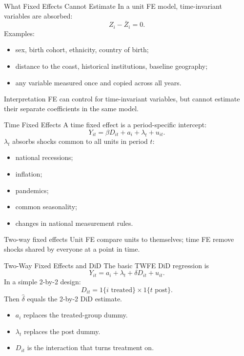 \documentclass[11pt,aspectratio=169]{beamer}
\newcommand{\derivbutton}[1]{\vspace{0.4em}\hfill\hyperlink{app:#1}{\beamerbutton{Appendix details}}}
\begin{document}
\begin{frame}{What Fixed Effects Cannot Estimate}
  In a unit FE model, time-invariant variables are absorbed:
  \[
    Z_i-\bar Z_i=0.
  \]
  Examples:
  \begin{itemize}
    \item sex, birth cohort, ethnicity, country of birth;
    \item distance to the coast, historical institutions, baseline geography;
    \item any variable measured once and copied across all years.
  \end{itemize}
  \begin{block}{Interpretation}
    FE can control for time-invariant variables, but cannot estimate their separate coefficients in the same model.
  \end{block}
\end{frame}

\begin{frame}{Time Fixed Effects}
  A time fixed effect is a period-specific intercept:
  \[
    Y_{it}=\beta D_{it}+a_i+\lambda_t+u_{it}.
  \]
  \vspace{0.3em}
  \(\lambda_t\) absorbs shocks common to all units in period \(t\):
  \begin{itemize}
    \item national recessions;
    \item inflation;
    \item pandemics;
    \item common seasonality;
    \item changes in national measurement rules.
  \end{itemize}
  \begin{block}{Two-way fixed effects}
    Unit FE compare units to themselves; time FE remove shocks shared by everyone at a point in time.
  \end{block}
\end{frame}

\begin{frame}{Two-Way Fixed Effects and DiD}
  \hypertarget{main:twfe}{}
  The basic TWFE DiD regression is
  \[
    Y_{it}
    =
    a_i+\lambda_t+\delta D_{it}+u_{it}.
  \]
  In a simple 2-by-2 design:
  \[
    D_{it}=1\{i\text{ treated}\}\times 1\{t\text{ post}\}.
  \]
  Then \(\hat\delta\) equals the 2-by-2 DiD estimate.
  \begin{itemize}
    \item \(a_i\) replaces the treated-group dummy.
    \item \(\lambda_t\) replaces the post dummy.
    \item \(D_{it}\) is the interaction that turns treatment on.
  \end{itemize}
  \derivbutton{twfe-equivalence}
\end{frame}
\end{document}
